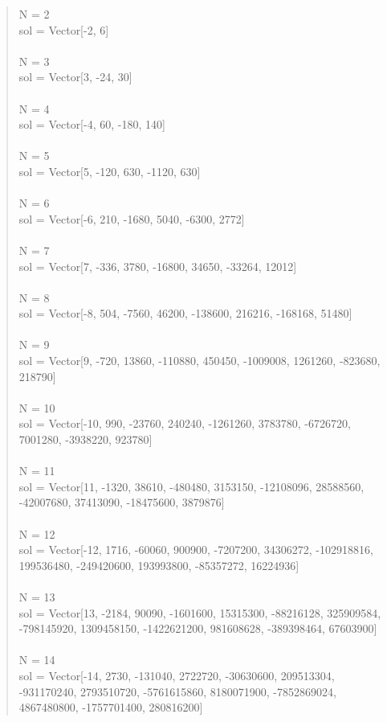 \documentclass[letterpaper,12pt]{article}
\begin{document}
\begin{quote}
N = 2
\\sol = Vector[-2, 6]
\\
\\N = 3
\\sol = Vector[3, -24, 30]
\\
\\N = 4
\\sol = Vector[-4, 60, -180, 140]
\\
\\N = 5
\\sol = Vector[5, -120, 630, -1120, 630]
\\
\\N = 6
\\sol = Vector[-6, 210, -1680, 5040, -6300, 2772]
\\
\\N = 7
\\sol = Vector[7, -336, 3780, -16800, 34650, -33264, 12012]
\\
\\N = 8
\\sol = Vector[-8, 504, -7560, 46200, -138600, 216216, -168168, 51480]
\\
\\N = 9
\\sol = Vector[9, -720, 13860, -110880, 450450, -1009008, 1261260, -823680, 218790]
\\
\\N = 10
\\sol = Vector[-10, 990, -23760, 240240, -1261260, 3783780, -6726720, 7001280, -3938220, 923780]
\\
\\N = 11
\\sol = Vector[11, -1320, 38610, -480480, 3153150, -12108096, 28588560, -42007680, 37413090, -18475600, 3879876]
\\
\\N = 12
\\sol = Vector[-12, 1716, -60060, 900900, -7207200, 34306272, -102918816, 199536480, -249420600, 193993800, -85357272, 16224936]
\\
\\N = 13
\\sol = Vector[13, -2184, 90090, -1601600, 15315300, -88216128, 325909584, -798145920, 1309458150, -1422621200, 981608628, -389398464, 67603900]
\\
\\N = 14
\\sol = Vector[-14, 2730, -131040, 2722720, -30630600, 209513304, -931170240, 2793510720, -5761615860, 8180071900, -7852869024, 4867480800, -1757701400, 280816200]

\end{quote}
\end{document}

